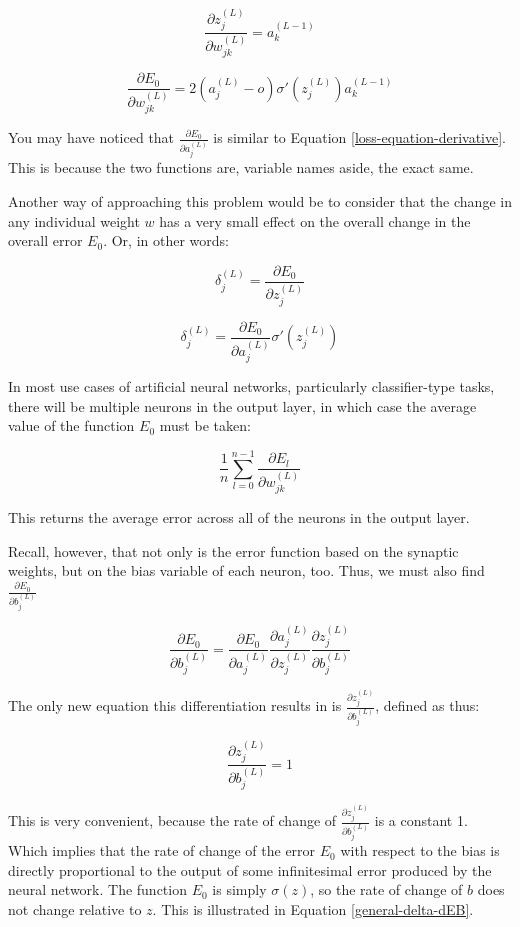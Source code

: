 \documentclass[12pt]{article}
\begin{document}
\[ \frac{\partial z_j^{(L)}}{\partial w_{jk}^{(L)}} = a_k^{(L-1)}\]

\begin{equation} \label{chain-rule-applied}
  \frac{\partial E_0}{\partial w_{jk}^{(L)}} = 2 (a_j^{(L)} - o) \sigma '(z_j^{(L)}) a_k^{(L-1)}
\end{equation}

You may have noticed that $\frac{\partial E_0}{\partial a_j^{(L)}}$ is similar to Equation \ref{loss-equation-derivative}. This is because the two functions are, variable names aside, the exact same.

Another way of approaching this problem would be to consider that the change in any individual weight $w$ has a very small effect on the overall change in the overall error $E_0$. Or, in other words:

\[ \delta_{j}^{(L)} = \frac{\partial E_0}{\partial z_j^{(L)}} \]

\[ \delta_j^{(L)} = \frac{\partial E_0}{\partial a_j^{(L)}} \sigma '(z_j^{(L)})\]

In most use cases of artificial neural networks, particularly classifier-type tasks, there will be multiple neurons in the output layer, in which case the average value of the function $E_0$ must be taken:

\[ \frac{1}{n}\sum_{l=0}^{n-1} \frac{\partial E_l}{\partial w_{jk}^{(L)}}\]

This returns the average error across all of the neurons in the output layer.

Recall, however, that not only is the error function based on the synaptic weights, but on the bias variable of each neuron, too. Thus, we must also find $\frac{\partial E_0}{\partial b_j^{(L)}}$

\[ \frac{\partial E_0}{\partial b_j^{(L)}} = \frac{\partial E_0}{\partial a_j^{(L)}} \frac{\partial a_j^{(L)}}{\partial z_j^{(L)}} \frac{\partial z_j^{(L)}}{\partial b_j^{(L)}}\]

The only new equation this differentiation results in is $\frac{\partial z_j^{(L)}}{\partial b_j^{(L)}}$, defined as thus:

\[\frac{\partial z_j^{(L)}}{\partial b_j^{(L)}} = 1 \]

This is very convenient, because the rate of change of $\frac{\partial z_j^{(L)}}{\partial b_j^{(L)}}$ is a constant 1. Which implies that the rate of change of the error $E_0$ with respect to the bias is directly proportional to the output of some infinitesimal error produced by the neural network. The function $E_0$ is simply $\sigma(z)$, so the rate of change of $b$ does not change relative to $z$. This is illustrated in Equation \ref{general-delta-dEB}.
\end{document}
